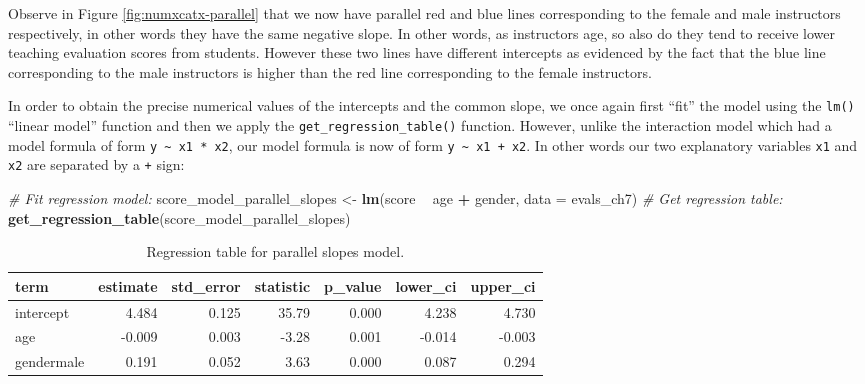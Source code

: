 \documentclass[12pt, krantz2,]{krantz}
\makeatletter
\newenvironment{Shaded}{\begin{snugshade}}{\end{snugshade}}
\newcommand{\CommentTok}[1]{\textcolor[rgb]{0.37,0.37,0.37}{\textit{#1}}}
\newcommand{\DataTypeTok}[1]{\textcolor[rgb]{0.27,0.27,0.27}{#1}}
\newcommand{\KeywordTok}[1]{\textcolor[rgb]{0.27,0.27,0.27}{\textbf{#1}}}
\newcommand{\NormalTok}[1]{#1}
\newcommand{\OperatorTok}[1]{\textcolor[rgb]{0.43,0.43,0.43}{\textbf{#1}}}
\newcommand{\StringTok}[1]{\textcolor[rgb]{0.5,0.5,0.5}{#1}}
\newenvironment{kframe}{%
\medskip{}
\setlength{\fboxsep}{.8em}
 \def\at@end@of@kframe{}%
 \ifinner\ifhmode%
  \def\at@end@of@kframe{\end{minipage}}%
  \begin{minipage}{\columnwidth}%
 \fi\fi%
 \def\FrameCommand##1{\hskip\@totalleftmargin \hskip-\fboxsep
 \colorbox{shadecolor}{##1}\hskip-\fboxsep
     \hskip-\linewidth \hskip-\@totalleftmargin \hskip\columnwidth}%
 \MakeFramed {\advance\hsize-\width
   \@totalleftmargin\z@ \linewidth\hsize
   \@setminipage}}%
 {\par\unskip\endMakeFramed%
 \at@end@of@kframe}
\renewenvironment{Shaded}{\begin{kframe}}{\end{kframe}}
\makeatother
\begin{document}
Observe in Figure \ref{fig:numxcatx-parallel} that we now have parallel red and blue lines corresponding to the female and male instructors respectively, in other words they have the same negative slope. In other words, as instructors age, so also do they tend to receive lower teaching evaluation scores from students. However these two lines have different intercepts as evidenced by the fact that the blue line corresponding to the male instructors is higher than the red line corresponding to the female instructors.

In order to obtain the precise numerical values of the intercepts and the common slope, we once again first ``fit'' the model using the \texttt{lm()} ``linear model'' function and then we apply the \texttt{get\_regression\_table()} function. However, unlike the interaction model which had a model formula of form \texttt{y\ \textasciitilde{}\ x1\ *\ x2}, our model formula is now of form \texttt{y\ \textasciitilde{}\ x1\ +\ x2}. In other words our two explanatory variables \texttt{x1} and \texttt{x2} are separated by a \texttt{+} sign:

\begin{Shaded}
\begin{Highlighting}[]
\CommentTok{# Fit regression model:}
\NormalTok{score_model_parallel_slopes <-}\StringTok{ }\KeywordTok{lm}\NormalTok{(score }\OperatorTok{~}\StringTok{ }\NormalTok{age }\OperatorTok{+}\StringTok{ }\NormalTok{gender, }\DataTypeTok{data =}\NormalTok{ evals_ch7)}
\CommentTok{# Get regression table:}
\KeywordTok{get_regression_table}\NormalTok{(score_model_parallel_slopes)}
\end{Highlighting}
\end{Shaded}

\begin{table}[H]

\caption{\label{tab:regtable-parallel-slopes}Regression table for parallel slopes model.}
\centering
\fontsize{10}{12}\selectfont
\begin{tabular}{lrrrrrr}
\toprule
term & estimate & std\_error & statistic & p\_value & lower\_ci & upper\_ci\\
\midrule
intercept & 4.484 & 0.125 & 35.79 & 0.000 & 4.238 & 4.730\\
age & -0.009 & 0.003 & -3.28 & 0.001 & -0.014 & -0.003\\
gendermale & 0.191 & 0.052 & 3.63 & 0.000 & 0.087 & 0.294\\
\bottomrule
\end{tabular}
\end{table}
\end{document}
